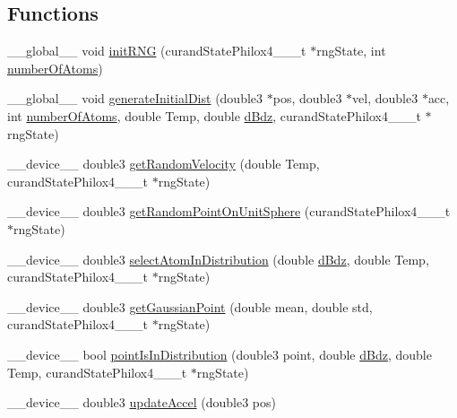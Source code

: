 \subsection*{Functions}
\begin{DoxyCompactItemize}
\item 
\+\_\+\+\_\+global\+\_\+\+\_\+ void \hyperlink{set_up_8cuh_a59b2f493671738afe527c78b5403abc6}{init\+R\+N\+G} (curand\+State\+Philox4\+\_\+\_\+\_\+t $\ast$rng\+State, int \hyperlink{initial_system_parameters_8cuh_a5ce690e43012981ef3034cbf0c746489}{number\+Of\+Atoms})
\item 
\+\_\+\+\_\+global\+\_\+\+\_\+ void \hyperlink{set_up_8cuh_a2270711d34c72488e0e0bf52daaeee4b}{generate\+Initial\+Dist} (double3 $\ast$pos, double3 $\ast$vel, double3 $\ast$acc, int \hyperlink{initial_system_parameters_8cuh_a5ce690e43012981ef3034cbf0c746489}{number\+Of\+Atoms}, double Temp, double \hyperlink{initial_system_parameters_8cuh_a25fc2a358206c74d3dfd41c48d05bb9d}{d\+Bdz}, curand\+State\+Philox4\+\_\+\_\+\_\+t $\ast$rng\+State)
\item 
\+\_\+\+\_\+device\+\_\+\+\_\+ double3 \hyperlink{set_up_8cuh_a0ffd35e69bde34e9f1c41797f7382f5e}{get\+Random\+Velocity} (double Temp, curand\+State\+Philox4\+\_\+\_\+\_\+t $\ast$rng\+State)
\item 
\+\_\+\+\_\+device\+\_\+\+\_\+ double3 \hyperlink{set_up_8cuh_a47d515269c13a8396d1fb013d5843c0b}{get\+Random\+Point\+On\+Unit\+Sphere} (curand\+State\+Philox4\+\_\+\_\+\_\+t $\ast$rng\+State)
\item 
\+\_\+\+\_\+device\+\_\+\+\_\+ double3 \hyperlink{set_up_8cuh_ae4b8b56540614cdfa269005ac68c1bff}{select\+Atom\+In\+Distribution} (double \hyperlink{initial_system_parameters_8cuh_a25fc2a358206c74d3dfd41c48d05bb9d}{d\+Bdz}, double Temp, curand\+State\+Philox4\+\_\+\_\+\_\+t $\ast$rng\+State)
\item 
\+\_\+\+\_\+device\+\_\+\+\_\+ double3 \hyperlink{set_up_8cuh_ad83d6db13f08f46be5179dac799cd0d9}{get\+Gaussian\+Point} (double mean, double std, curand\+State\+Philox4\+\_\+\_\+\_\+t $\ast$rng\+State)
\item 
\+\_\+\+\_\+device\+\_\+\+\_\+ bool \hyperlink{set_up_8cuh_a32f8cb52c6e7f4459effb9cd9bdf90e7}{point\+Is\+In\+Distribution} (double3 point, double \hyperlink{initial_system_parameters_8cuh_a25fc2a358206c74d3dfd41c48d05bb9d}{d\+Bdz}, double Temp, curand\+State\+Philox4\+\_\+\_\+\_\+t $\ast$rng\+State)
\item 
\+\_\+\+\_\+device\+\_\+\+\_\+ double3 \hyperlink{set_up_8cuh_a5fedaa6e6674256749ed34658343bfa3}{update\+Accel} (double3 pos)
\end{DoxyCompactItemize}


